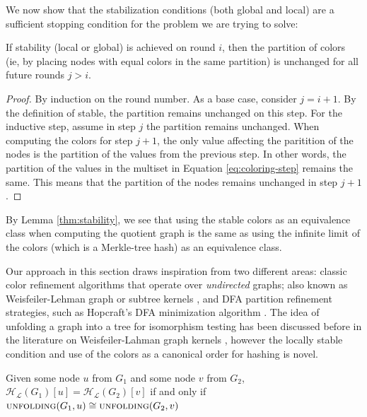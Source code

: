 \documentclass[twoside,leqno]{article}
\begin{document}
We now show that the stabilization conditions (both global and local) are a sufficient stopping condition for the problem we are trying to solve:

\begin{lemma}
\label{thm:stability}
If stability (local or global) is achieved on round $i$, then the partition of colors (ie, by placing nodes with equal colors in the same partition) is unchanged for all future rounds $j > i$.
\end{lemma}
\begin{proof}
By induction on the round number. As a base case, consider $j=i+1$. By the definition of stable, the partition remains unchanged on this step. For the inductive step, assume in step $j$ the partition remains unchanged. When computing the colors for step $j+1$, the only value affecting the paritition of the nodes is the partition of the values from the previous step. In other words, the partition of the values in the multiset in Equation \ref{eq:coloring-step} remains the same. This means that the partition of the nodes remains unchanged in step $j+1$.
\end{proof}

By Lemma \ref{thm:stability}, we see that using the stable colors as an equivalence class when computing the quotient graph is the same as using the infinite limit of the colors (which is a Merkle-tree hash) as an equivalence class.

Our approach in this section draws inspiration from two different areas: classic color refinement algorithms that operate over \textit{undirected} graphs; also known as Weisfeiler-Lehman graph or subtree kernels \cite{Shervashidze2011-dt}, and DFA partition refinement strategies, such as Hopcraft's DFA minimization algorithm \cite{hopcraft, hopcraft-redescribe}. The idea of unfolding a graph into a tree for isomorphism testing has been discussed before in the literature on Weisfeiler-Lahman graph kernels \cite{Shervashidze2011-dt, fast_subtree_kernels_on_graphs}, however the locally stable condition and use of the colors as a canonical order for hashing is novel.

\begin{theorem}
\label{thm:localhashcorrect}
Given some node $u$ from $G_1$ and some node $v$ from $G_2$, $\mathcal{H_L}(G_1)[u] = \mathcal{H_L}(G_2)[v]$ if and only if $\textproc{unfolding}(G_1, u) \cong \textproc{unfolding}(G_2, v)$
\end{theorem}
\end{document}
